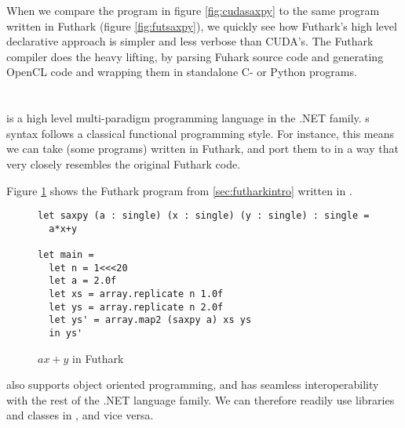 When we compare the program in figure \ref{fig:cudasaxpy} to the same program
written in Futhark (figure \ref{fig:futsaxpy}), we quickly see how Futhark's
high level declarative approach is simpler and less verbose than CUDA's.
The Futhark compiler does the heavy lifting, by parsing Fuhark source code and
generating OpenCL code and wrapping them in standalone C- or Python programs.

\section{\fsharp{}}
\fsharp{} is a high level multi-paradigm programming language in the .NET family.
\fsharp{}s syntax follows a classical functional programming style. For
instance, this means we can take (some programs) written in Futhark, and port
them to \fsharp{} in a way that very closely resembles the original Futhark
code.

Figure \ref{fig:fsharpsaxpy} shows the Futhark program from
\ref{sec:futharkintro} written in \fsharp{}.

\begin{figure}[H]
  \centering
\begin{verbatim}
let saxpy (a : single) (x : single) (y : single) : single =
  a*x+y
  
let main =
  let n = 1<<<20
  let a = 2.0f
  let xs = array.replicate n 1.0f
  let ys = array.replicate n 2.0f
  let ys' = array.map2 (saxpy a) xs ys
  in ys'
  \end{verbatim}
  \caption{$ax+y$ in Futhark}
  \label{fig:fsharpsaxpy}
\end{figure}

\fsharp{} also supports object oriented programming, and has seamless
interoperability with the rest of the .NET language family. We can therefore
readily use \csharp{} libraries and classes in \fsharp{}, and vice versa.

\section*{\csharp{}}
\csharp{} 
\csharp{} 
\csharp{} 
\csharp{} 


